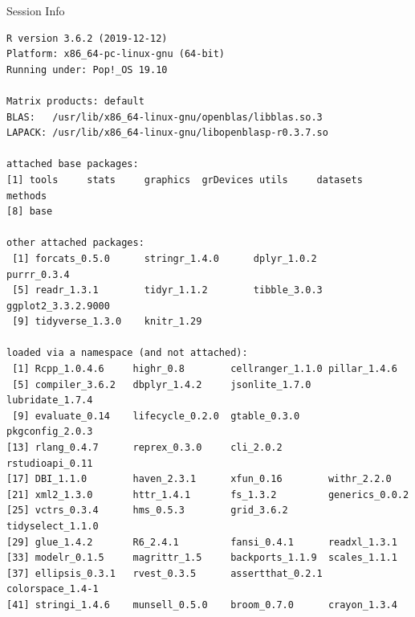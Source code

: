 \documentclass{beamer}\usepackage[]{graphicx}\usepackage[]{color}
\makeatletter
\newenvironment{kframe}{%
 \def\at@end@of@kframe{}%
 \ifinner\ifhmode%
  \def\at@end@of@kframe{\end{minipage}}%
  \begin{minipage}{\columnwidth}%
 \fi\fi%
 \def\FrameCommand##1{\hskip\@totalleftmargin \hskip-\fboxsep
 \colorbox{shadecolor}{##1}\hskip-\fboxsep
     \hskip-\linewidth \hskip-\@totalleftmargin \hskip\columnwidth}%
 \MakeFramed {\advance\hsize-\width
   \@totalleftmargin\z@ \linewidth\hsize
   \@setminipage}}%
 {\par\unskip\endMakeFramed%
 \at@end@of@kframe}
\newenvironment{knitrout}{}{} %
\makeatother
\begin{document}
\begin{frame}[fragile]{Session Info}
	\tiny
	
\begin{knitrout}\tiny
{}\color{fgcolor}\begin{kframe}
\begin{verbatim}
R version 3.6.2 (2019-12-12)
Platform: x86_64-pc-linux-gnu (64-bit)
Running under: Pop!_OS 19.10

Matrix products: default
BLAS:   /usr/lib/x86_64-linux-gnu/openblas/libblas.so.3
LAPACK: /usr/lib/x86_64-linux-gnu/libopenblasp-r0.3.7.so

attached base packages:
[1] tools     stats     graphics  grDevices utils     datasets  methods  
[8] base     

other attached packages:
 [1] forcats_0.5.0      stringr_1.4.0      dplyr_1.0.2        purrr_0.3.4       
 [5] readr_1.3.1        tidyr_1.1.2        tibble_3.0.3       ggplot2_3.3.2.9000
 [9] tidyverse_1.3.0    knitr_1.29        

loaded via a namespace (and not attached):
 [1] Rcpp_1.0.4.6     highr_0.8        cellranger_1.1.0 pillar_1.4.6    
 [5] compiler_3.6.2   dbplyr_1.4.2     jsonlite_1.7.0   lubridate_1.7.4 
 [9] evaluate_0.14    lifecycle_0.2.0  gtable_0.3.0     pkgconfig_2.0.3 
[13] rlang_0.4.7      reprex_0.3.0     cli_2.0.2        rstudioapi_0.11 
[17] DBI_1.1.0        haven_2.3.1      xfun_0.16        withr_2.2.0     
[21] xml2_1.3.0       httr_1.4.1       fs_1.3.2         generics_0.0.2  
[25] vctrs_0.3.4      hms_0.5.3        grid_3.6.2       tidyselect_1.1.0
[29] glue_1.4.2       R6_2.4.1         fansi_0.4.1      readxl_1.3.1    
[33] modelr_0.1.5     magrittr_1.5     backports_1.1.9  scales_1.1.1    
[37] ellipsis_0.3.1   rvest_0.3.5      assertthat_0.2.1 colorspace_1.4-1
[41] stringi_1.4.6    munsell_0.5.0    broom_0.7.0      crayon_1.3.4    
\end{verbatim}
\end{kframe}
\end{knitrout}
	
\end{frame}
\end{document}
